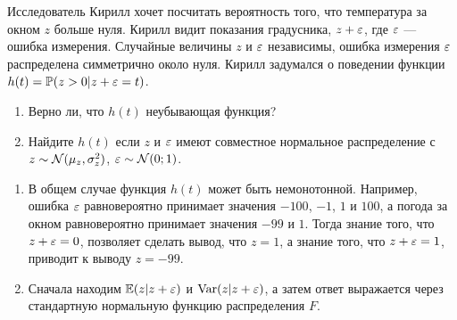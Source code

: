 \begin{problem}
Исследователь Кирилл хочет посчитать вероятность того, что температура за окном $z$ больше нуля.
Кирилл видит показания градусника, $z + \varepsilon$, где $\varepsilon$ — ошибка измерения. 
Случайные величины $z$ и $\varepsilon$ независимы, 
ошибка измерения $\varepsilon$ распределена симметрично около нуля.
Кирилл задумался о поведении функции $h(t)=\mathbb{P}(z > 0 | z + \varepsilon = t)$. 

  \begin{enumerate}
      \item Верно ли, что $h(t)$ неубывающая функция?
      \item Найдите $h(t)$ если $z$ и $\varepsilon$ имеют совместное нормальное распределение с $z\sim \mathcal{N}(\mu_z, \sigma^2_z)$, $\varepsilon\sim \mathcal{N}(0;1)$.
  \end{enumerate}
  \begin{sol}
  \begin{enumerate}
    \item В общем случае функция $h(t)$ может быть немонотонной. 
      Например, ошибка $\varepsilon$ равновероятно принимает значения $-100$, $-1$, $1$ и $100$, 
      а погода за окном равновероятно принимает значения $-99$ и $1$.
      Тогда знание того, что $z+\varepsilon=0$, позволяет сделать вывод, что $z=1$,
      а знание того, что $z+\varepsilon = 1$, приводит к выводу $z=-99$.
    \item Сначала находим $\mathbb{E}(z|z+\varepsilon)$ и $\operatorname{Var}(z|z+\varepsilon)$, а затем ответ выражается через стандартную нормальную функцию распределения $F$.
  \end{enumerate}
\end{sol}
\end{problem}




